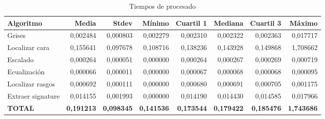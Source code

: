 \begin{table}[!hb]
 \begin{tabular}{|l||r|r||r|r|r|r|r|}
	\hline 
	\textbf{Algoritmo} & \textbf{Media} & \textbf{Stdev} & \textbf{Mínimo} & \textbf{Cuartil 1} & \textbf{Mediana} & \textbf{Cuartil 3} & \textbf{Máximo} \\
	\hline \hline
	Grises & 0,002484 & 0,000803 & 0,002279 & 0,002310 & 0,002322 & 0,002363 & 0,017717 \\
	\hline
	Localizar cara & 0,155641 & 0,097678 & 0,108716 & 0,138236 & 0,143928 & 0,149868 & 1,708662 \\
	\hline
	Escalado & 0,000264 & 0,000051 & 0,000000 & 0,000264 & 0,000267 & 0,000269 & 0,000719 \\
	\hline
	Ecualización & 0,000066 & 0,000011 & 0,000000 & 0,000067 & 0,000068 & 0,000068 & 0,000095 \\
	\hline
	Localizar rasgos& 0,000692 & 0,000111 & 0,000000 & 0,000680 & 0,000691 & 0,000705 & 0,001175 \\
	\hline
	Extraer signature  & 0,014155 & 0,001993 & 0,000000 & 0,014190 & 0,014430 & 0,014585 & 0,017966 \\
	\hline \hline
	\textbf{TOTAL} & \textbf{0,191213} & \textbf{0,098345} & \textbf{0,141536} & \textbf{0,173544} & \textbf{0,179422} & \textbf{0,185476} & \textbf{1,743686} \\
	\hline
 \end{tabular}
 \caption{Tiempos de procesado}
 \label{tab:stats_time}
\end{table}
